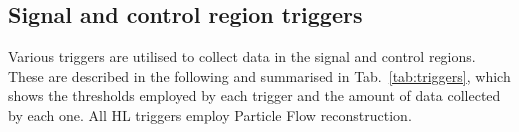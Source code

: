 

\subsection{Signal and control region triggers}

Various triggers are utilised to collect data in the signal and control 
regions. These are described in the following and summarised in 
Tab.~\ref{tab:triggers}, which shows the thresholds employed by each trigger 
and the amount of data collected by each one. All HL triggers employ Particle 
Flow reconstruction.

